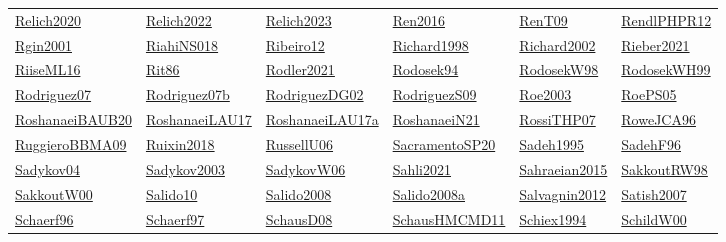 \begin{longtable}{*{6}{l}}
\hyperref[detail:Relich2020]{Relich2020} & \hyperref[detail:Relich2022]{Relich2022} & \hyperref[detail:Relich2023]{Relich2023} & \hyperref[detail:Ren2016]{Ren2016} & \hyperref[detail:RenT09]{RenT09} & \hyperref[detail:RendlPHPR12]{RendlPHPR12}\\ 
\hyperref[detail:Rgin2001]{Rgin2001} & \hyperref[detail:RiahiNS018]{RiahiNS018} & \hyperref[detail:Ribeiro12]{Ribeiro12} & \hyperref[detail:Richard1998]{Richard1998} & \hyperref[detail:Richard2002]{Richard2002} & \hyperref[detail:Rieber2021]{Rieber2021}\\ 
\hyperref[detail:RiiseML16]{RiiseML16} & \hyperref[detail:Rit86]{Rit86} & \hyperref[detail:Rodler2021]{Rodler2021} & \hyperref[detail:Rodosek94]{Rodosek94} & \hyperref[detail:RodosekW98]{RodosekW98} & \hyperref[detail:RodosekWH99]{RodosekWH99}\\ 
\hyperref[detail:Rodriguez07]{Rodriguez07} & \hyperref[detail:Rodriguez07b]{Rodriguez07b} & \hyperref[detail:RodriguezDG02]{RodriguezDG02} & \hyperref[detail:RodriguezS09]{RodriguezS09} & \hyperref[detail:Roe2003]{Roe2003} & \hyperref[detail:RoePS05]{RoePS05}\\ 
\hyperref[detail:RoshanaeiBAUB20]{RoshanaeiBAUB20} & \hyperref[detail:RoshanaeiLAU17]{RoshanaeiLAU17} & \hyperref[detail:RoshanaeiLAU17a]{RoshanaeiLAU17a} & \hyperref[detail:RoshanaeiN21]{RoshanaeiN21} & \hyperref[detail:RossiTHP07]{RossiTHP07} & \hyperref[detail:RoweJCA96]{RoweJCA96}\\ 
\hyperref[detail:RuggieroBBMA09]{RuggieroBBMA09} & \hyperref[detail:Ruixin2018]{Ruixin2018} & \hyperref[detail:RussellU06]{RussellU06} & \hyperref[detail:SacramentoSP20]{SacramentoSP20} & \hyperref[detail:Sadeh1995]{Sadeh1995} & \hyperref[detail:SadehF96]{SadehF96}\\ 
\hyperref[detail:Sadykov04]{Sadykov04} & \hyperref[detail:Sadykov2003]{Sadykov2003} & \hyperref[detail:SadykovW06]{SadykovW06} & \hyperref[detail:Sahli2021]{Sahli2021} & \hyperref[detail:Sahraeian2015]{Sahraeian2015} & \hyperref[detail:SakkoutRW98]{SakkoutRW98}\\ 
\hyperref[detail:SakkoutW00]{SakkoutW00} & \hyperref[detail:Salido10]{Salido10} & \hyperref[detail:Salido2008]{Salido2008} & \hyperref[detail:Salido2008a]{Salido2008a} & \hyperref[detail:Salvagnin2012]{Salvagnin2012} & \hyperref[detail:Satish2007]{Satish2007}\\ 
\hyperref[detail:Schaerf96]{Schaerf96} & \hyperref[detail:Schaerf97]{Schaerf97} & \hyperref[detail:SchausD08]{SchausD08} & \hyperref[detail:SchausHMCMD11]{SchausHMCMD11} & \hyperref[detail:Schiex1994]{Schiex1994} & \hyperref[detail:SchildW00]{SchildW00}\\ 

\end{longtable}
